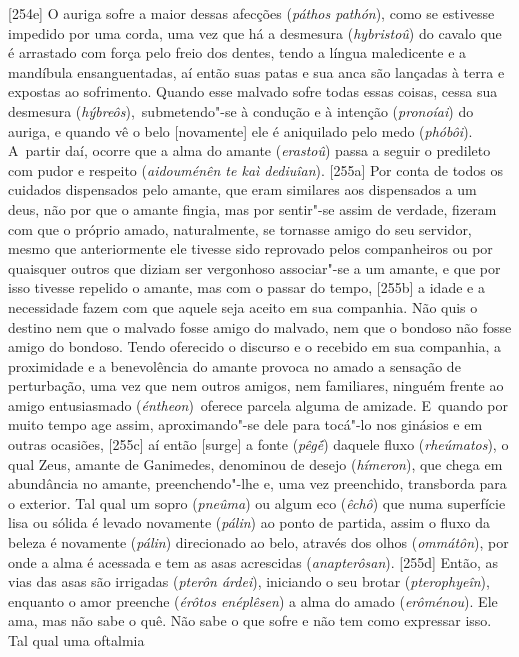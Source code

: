 [254e] O auriga sofre a maior dessas afecções (\emph{páthos
pathón}), como se estivesse impedido por uma corda, uma vez que há a
desmesura (\emph{hybristoû}) do cavalo que é arrastado com força pelo
freio dos dentes, tendo a língua maledicente e a mandíbula
ensanguentadas, aí então suas patas e sua anca são lançadas à terra e
expostas ao sofrimento. Quando esse malvado sofre todas essas coisas,
cessa sua desmesura (\emph{hýbreôs}),~submetendo"-se à condução e à
intenção (\emph{pronoíai}) do auriga, e quando vê o belo [novamente]
ele é aniquilado pelo medo (\emph{phóbôi}). A~partir daí, ocorre que a
alma do amante (\emph{erastoû}) passa a seguir o predileto com pudor e
respeito (\emph{aidouménên te kaì dediuîan}). [255a] Por conta de
todos os cuidados dispensados pelo amante, que eram similares aos
dispensados a um deus, não por que o amante fingia, mas por sentir"-se
assim de verdade, fizeram com que o próprio amado, naturalmente, se
tornasse amigo do seu servidor, mesmo que anteriormente ele tivesse sido
reprovado pelos companheiros ou por quaisquer outros que diziam ser
vergonhoso associar"-se a um amante, e que por isso tivesse repelido o
amante, mas com o passar do tempo, [255b] a idade e a necessidade
fazem com que aquele seja aceito em sua companhia. Não quis o destino
nem que o malvado fosse amigo do malvado, nem que o bondoso não fosse
amigo do bondoso. Tendo oferecido o discurso e o recebido em sua
companhia, a proximidade e a benevolência do amante provoca no amado a
sensação de perturbação, uma vez que nem outros amigos, nem familiares,
ninguém frente ao amigo entusiasmado (\emph{éntheon})~oferece parcela
alguma de amizade. E~quando por muito tempo age assim, aproximando"-se
dele para tocá"-lo nos ginásios e em outras ocasiões, [255c] aí então
[surge] a fonte (\emph{pêgḗ}) daquele fluxo (\emph{rheúmatos}), o
qual Zeus, amante de Ganimedes, denominou de desejo (\emph{hímeron}),
que chega em abundância no amante, preenchendo"-lhe e, uma vez
preenchido, transborda para o exterior. Tal qual um sopro
(\emph{pneûma}) ou algum eco (\emph{êchô}) que numa superfície lisa ou
sólida é levado novamente (\emph{pálin}) ao ponto de partida, assim o
fluxo da beleza é novamente (\emph{pálin}) direcionado ao belo, através
dos olhos (\emph{ommátôn}), por onde a alma é acessada e tem as asas
acrescidas (\emph{anapterôsan}). [255d] Então, as vias das asas são
irrigadas (\emph{pterôn árdei}), iniciando o seu brotar
(\emph{pterophyeîn}), enquanto o amor preenche (\emph{érôtos enéplêsen})
a alma do amado (\emph{erôménou}). Ele ama, mas não sabe o quê. Não sabe
o que sofre e não tem como expressar isso. Tal qual uma oftalmia
